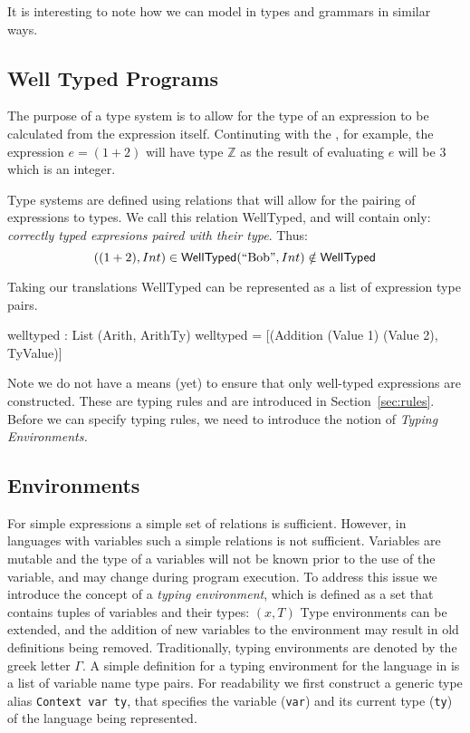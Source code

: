 \noindent
It is interesting to note how we can model in \idris{} types and grammars in similar ways.

\subsection{Well Typed Programs}
\label{sec:types:well-typed}


The purpose of a type system is to allow for the type of an expression to be calculated from the expression itself.
Continuting with the \allang{}, for example, the expression $e=(1 + 2)$ will have type $\mathbb{Z}$ as the result of evaluating $e$ will be $3$ which is an integer.

Type systems are defined using relations that will allow for the pairing of expressions to types.
We call this relation \textsf{WellTyped}, and will contain only: \emph{correctly typed expresions paired with their type}.
Thus:
\[
((1+2), Int)\in\mathsf{WellTyped}\\
(\text{``Bob''},Int)\notin\mathsf{WellTyped}
\]

\noindent
Taking our \idris{} translations \textsf{WellTyped} can be represented as a list of expression type pairs.

\begin{code}
welltyped : List (Arith, ArithTy)
welltyped = [(Addition (Value 1) (Value 2), TyValue)]
\end{code}

\noindent
Note we do not have a means (yet) to ensure that only well-typed expressions are constructed.
These are typing rules and are introduced in Section~\ref{sec:rules}.
Before we can specify typing rules, we need to introduce the notion of \emph{Typing Environments.}

\subsection{Environments}
\label{sec:type:env}

For simple expressions a simple set of relations is sufficient.
However, in languages with variables such a simple relations is not sufficient.
Variables are mutable and the type of a variables will not be known prior to the use of the variable, and may change during program execution.
To address this issue we introduce the concept of a \emph{typing environment}, which is defined as a set that contains tuples of variables and their types: $(x,T)$
Type environments can be extended, and the addition of new variables to the environment may result in old definitions being removed.
Traditionally, typing environments are denoted by the greek letter $\Gamma$.
A simple definition for a typing environment for the \allang{} language in \idris{} is a list of variable name type pairs.
For readability we first construct a generic type alias \texttt{Context var ty}, that specifies the variable  (\texttt{var}) and its current type (\texttt{ty}) of the language being represented.

